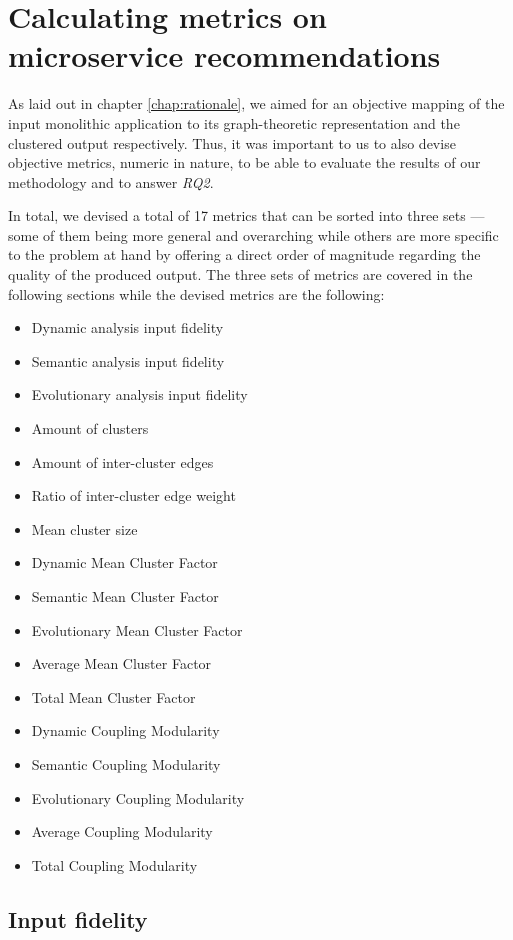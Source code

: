 \documentclass[12pt,a4paper]{report}
\begin{document}
\chapter{Calculating metrics on microservice recommendations} \label{chap:metrics}

As laid out in chapter \ref{chap:rationale}, we aimed for an objective
mapping of the input monolithic application to its graph-theoretic representation
and the clustered output respectively.
Thus, it was important to us to also devise objective metrics, numeric in nature,
to be able to evaluate the results of our methodology and to answer \textit{RQ2}.

In total, we devised a total of 17 metrics that can be sorted into three sets ---
some of them being more general and overarching while others are more specific
to the problem at hand by offering a direct order of magnitude regarding the
quality of the produced output. The three sets of metrics are covered
in the following sections while the devised metrics are the following:
\begin{itemize}
  \item Dynamic analysis input fidelity
  \item Semantic analysis input fidelity
  \item Evolutionary analysis input fidelity
  \item Amount of clusters
  \item Amount of inter-cluster edges
  \item Ratio of inter-cluster edge weight
  \item Mean cluster size
  \item Dynamic Mean Cluster Factor
  \item Semantic Mean Cluster Factor
  \item Evolutionary Mean Cluster Factor
  \item Average Mean Cluster Factor
  \item Total Mean Cluster Factor
  \item Dynamic Coupling Modularity
  \item Semantic Coupling Modularity
  \item Evolutionary Coupling Modularity
  \item Average Coupling Modularity
  \item Total Coupling Modularity
\end{itemize}



\section{Input fidelity} \label{sect:input-fidelity-metrics}
\end{document}
